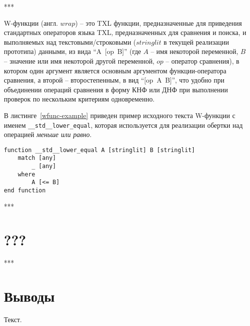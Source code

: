 ***

W-функции (англ. $wrap$) -- это TXL функции, предназначенные для приведения стандартных операторов языка TXL, предназначенных для сравнения и поиска, и выполняемых над текстовыми/строковыми ($stringlit$ в текущей реализации прототипа) данными, из вида ``A~[op~B]'' (где $A$ -- имя некоторой переменной, $B$ -- значение или имя некоторой другой переменной, $op$ -- оператор сравнения), в котором один аргумент является основным аргументом функции-оператора сравнения, а второй -- второстепенным, в вид ``[op~A~B]'', что удобно при объединении операций сравнения в форму КНФ или ДНФ при выполнении проверок по нескольким критериям одновременно.

В листинге~\ref{wfunc-example} приведен пример исходного текста W-функции с именем \lstinline{__std__lower_equal}, которая используется для реализации обертки над операцией \textit{меньше или равно}.

\begin{lstlisting}[frame=single, language=TXL, label={wfunc-example}, caption={Пример W-функции}]
function __std__lower_equal A [stringlit] B [stringlit]
	match [any]
		_ [any]
	where
		A [<= B]
end function
\end{lstlisting}

***

\section{???}

***

\section{Выводы}

Текст.
